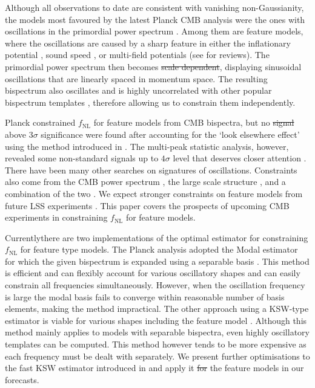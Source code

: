 \documentclass[a4paper,12pt,times,custombib,print,index]{Classes/PhDThesisPSnPDF} %
\providecommand{\DIFadd}[1]{{\protect\color{blue}\uwave{#1}}} %
\providecommand{\DIFdel}[1]{{\protect\color{red}\sout{#1}}}                      %
\providecommand{\DIFaddbegin}{} %
\providecommand{\DIFaddend}{} %
\providecommand{\DIFdelbegin}{} %
\providecommand{\DIFdelend}{} %
\newcommand{\DIFscaledelfig}{0.5}
\newlength{\DIFdelgraphicswidth} %
\newlength{\DIFdelgraphicsheight} %
\newcommand{\DIFaddincludegraphics}[2][]{{\color{blue}\fbox{\DIFOincludegraphics[#1]{#2}}}} %
\newcommand{\DIFdelincludegraphics}[2][]{%
\sbox{\DIFdelgraphicsbox}{\DIFOincludegraphics[#1]{#2}}%
\settoboxwidth{\DIFdelgraphicswidth}{\DIFdelgraphicsbox} %
\settoboxtotalheight{\DIFdelgraphicsheight}{\DIFdelgraphicsbox} %
\scalebox{\DIFscaledelfig}{%
\parbox[b]{\DIFdelgraphicswidth}{\usebox{\DIFdelgraphicsbox}\\[-\baselineskip] \rule{\DIFdelgraphicswidth}{0em}}\llap{\resizebox{\DIFdelgraphicswidth}{\DIFdelgraphicsheight}{%
\setlength{\unitlength}{\DIFdelgraphicswidth}%
\begin{picture}(1,1)%
\thicklines\linethickness{2pt} %
{\color[rgb]{1,0,0}\put(0,0){\framebox(1,1){}}}%
{\color[rgb]{1,0,0}\put(0,0){\line( 1,1){1}}}%
{\color[rgb]{1,0,0}\put(0,1){\line(1,-1){1}}}%
\end{picture}%
}\hspace*{3pt}}} %
} %
\DeclareRobustCommand{\DIFaddbegin}{\DIFOaddbegin \let\includegraphics\DIFaddincludegraphics} %
\DeclareRobustCommand{\DIFaddend}{\DIFOaddend \let\includegraphics\DIFOincludegraphics} %
\DeclareRobustCommand{\DIFdelbegin}{\DIFOdelbegin \let\includegraphics\DIFdelincludegraphics} %
\DeclareRobustCommand{\DIFdelend}{\DIFOaddend \let\includegraphics\DIFOincludegraphics} %
\begin{document}
Although all observations to date are consistent with vanishing non-Gaussianity, the models most favoured by the latest Planck CMB analysis were the ones with oscillations in the primordial power spectrum \cite{PlanckCollaboration2015}. Among them are feature models, where the oscillations are caused by a sharp feature in either the inflationary potential \cite{starobinsky1992,Adams2001,Chen2007,Adshead2012,Hazra2014,Dvorkin2010}, sound speed \cite{Miranda2012,Bartolo2013}, or multi-field potentials \cite{Achucarro2011} (see \cite{Chen2010review,Chluba2015} for reviews). The primordial power spectrum then becomes \DIFdelbegin \DIFdel{scale dependent}\DIFdelend \DIFaddbegin \DIFadd{scale-dependent}\DIFaddend , displaying sinusoidal oscillations that are linearly spaced in momentum space. The resulting bispectrum also oscillates and is highly uncorrelated with other popular bispectrum templates \cite{Meerburg2009signatures}, therefore allowing us to constrain them independently.

Planck constrained $f_\text{NL}$ for feature models from CMB bispectra, but no \DIFdelbegin \DIFdel{signal }\DIFdelend \DIFaddbegin \DIFadd{signals }\DIFaddend above $3\sigma$ significance were found after accounting for the `look elsewhere effect' using the method introduced in \cite{Fergusson2015a}. The multi-peak statistic analysis, however, revealed some non-standard signals up to $4\sigma$ level that deserves closer attention \cite{PlanckCollaboration2015}. There have been many other searches on signatures of oscillations. Constraints also come from the CMB power spectrum \cite{Martin2004,Benetti2011,Meerburg2012,Meerburg2014a,Meerburg2014,Fergusson2015b}, the large scale structure \cite{Chantavat2011,Ballardini2016}, and a combination of the two \cite{Hu2015,Benetti2016}. We expect stronger constraints on feature models from future LSS experiments \cite{Chen2016}. This paper covers the prospects of upcoming CMB experiments in constraining $f_\text{NL}$ for feature models.

Currently\DIFaddbegin \DIFadd{, }\DIFaddend there are two implementations of the optimal estimator for constraining $f_\text{NL}$ for feature type models. The Planck analysis adopted the Modal estimator for which the given bispectrum is expanded using a separable basis \cite{Fergusson2012,Fergusson2014}. This method is efficient and can flexibly account for various oscillatory shapes and can easily constrain all frequencies simultaneously. However, when the oscillation frequency is large the modal basis fails to converge within \DIFaddbegin \DIFadd{a }\DIFaddend reasonable number of basis elements, making the method impractical. The other approach using a KSW-type estimator is viable for various shapes including the feature model \cite{Komatsu2005,Munchmeyer2014}. Although this method mainly applies to models with separable bispectra, even highly oscillatory templates can be computed.  This method however tends to be more expensive as each frequency must be dealt with separately. We present further optimisations to the fast KSW estimator introduced in \cite{Yadav2007} and apply it \DIFdelbegin \DIFdel{for }\DIFdelend \DIFaddbegin \DIFadd{to }\DIFaddend the feature models in our forecasts.
\end{document}
